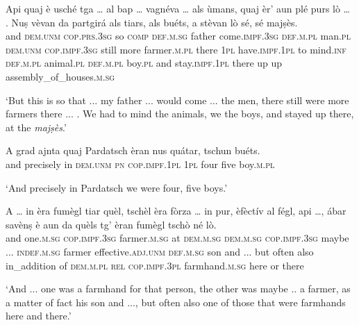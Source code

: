 \begin{linenumbers}
	\gll Api quaj è usché tga … al bap … vagnéva … als ùmans, quaj èr’ aun plé purs lò … . Nuṣ vèvan da partgirá als tiars, als buéts, a stèvan lò sé, sé majṣès.   \\
	and \textsc{dem.unm} \textsc{cop.prs.3sg} so \textsc{comp} {} \textsc{def.m.sg} father {} come.\textsc{impf.3sg} {} \textsc{def.m.pl} man.\textsc{pl} \textsc{dem.unm} \textsc{cop.impf.3sg} still more farmer.\textsc{m.pl} there {} {} \textsc{1pl} have.\textsc{impf.1pl} to mind.\textsc{inf} \textsc{def.m.pl} animal.\textsc{pl} \textsc{def.m.pl} boy.\textsc{pl} and stay.\textsc{impf.1pl} there up up assembly\_of\_houses.\textsc{m.sg}\\
\end{linenumbers}
\medskip
\glt `But this is so that ... my father ... would come ... the men, there still were more farmers there ... . We had to mind the animals, we the boys, and stayed up there, at the \textit{majṣès}.'
\medskip

\begin{linenumbers}
	\gll A grad ajnta quaj Pardatsch èran nus quátar, tschun buéts.   \\
	and precisely in \textsc{dem.unm} \textsc{pn} \textsc{cop.impf.1pl} \textsc{1pl} four five boy.\textsc{m.pl}\\
\end{linenumbers}
\medskip
\glt `And precisely in Pardatsch we were four, five boys.'
\medskip

\begin{linenumbers}
	\gll A … in èra fumègl tiar quèl, tschèl èra fòrza … in pur, èfèctív al fégl, api …, ábar savènṣ è aun da quèls tg’ èran fumègl tschò né lò.\\
	and {} one.\textsc{m.sg} \textsc{cop.impf.3sg} farmer.\textsc{m.sg} at \textsc{dem.m.sg} \textsc{dem.m.sg} \textsc{cop.impf.3sg} maybe ... \textsc{indef.m.sg} farmer effective.\textsc{adj.unm} \textsc{def.m.sg} son and ... but often also in\_addition of \textsc{dem.m.pl} \textsc{rel} \textsc{cop.impf.3pl} farmhand.\textsc{m.sg} here or there\\
\end{linenumbers}
\medskip
\glt `And ... one was a farmhand for that person, the other was maybe .. a farmer, as a matter of fact his son and ..., but often also one of those that were farmhands here and there.'
\medskip

